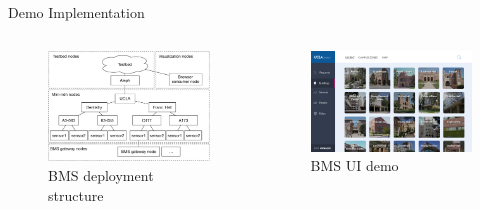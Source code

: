 \documentclass[final,hyperref={pdfpagelabels=false},20pt]{beamer}
\begin{document}
\begin{frame}[t]
\begin{columns}[t]
\begin{column}{.465\textwidth}
\begin{block}{Demo Implementation}
\begin{columns}[T]
\begin{column}{.44\textwidth}
\begin{figure}
\includegraphics[width=1\linewidth]{bms-nodes-structure}
\caption{BMS deployment structure}
\label{fig:node-structure}
\end{figure}
\end{column}

\begin{column}{.48\textwidth}
\begin{figure}
\includegraphics[width=\linewidth]{bms-ui-demo.png}
\caption{BMS UI demo}
\label{fig:bms-ui}
\end{figure}
\end{column}

\end{columns}

\end{block}



\end{column}
\end{columns}
\end{frame}
\end{document}
